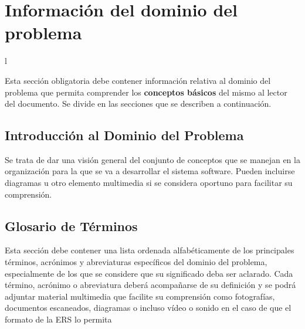 \section{Información del dominio del problema}

  l
\begin{textoazul}
 
 Esta sección obligatoria debe contener información relativa al dominio del problema que permita comprender los \textbf{conceptos básicos} del mismo al lector del documento. Se divide en las secciones que se describen a continuación.
 
\end{textoazul}
 
\subsection{Introducción al Dominio del Problema}

 \begin{textoazul}
 Se trata de dar una visión general del conjunto de conceptos que se manejan en la organización para la que se va a desarrollar el sistema software. Pueden incluirse diagramas u otro elemento multimedia si se considera oportuno para facilitar su comprensión.
 
 \end{textoazul}
 
\subsection{Glosario de Términos}

 \begin{textoazul}
 Esta sección debe contener una lista ordenada alfabéticamente de los principales términos, acrónimos y abreviaturas específicos del dominio del problema, especialmente de los que se considere que su significado deba ser aclarado. Cada término, acrónimo o abreviatura deberá acompañarse de su definición y se podrá adjuntar material multimedia que facilite su comprensión como fotografías, documentos escaneados, diagramas o incluso vídeo o sonido en el caso de que el formato de la ERS lo permita

\end{textoazul}
